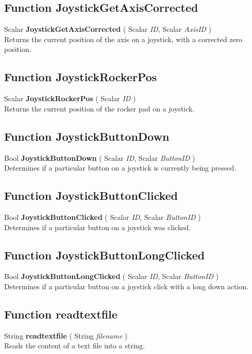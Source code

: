 \documentclass[10pt]{book}
\begin{document}
\subsection{Function JoystickGetAxisCorrected \label{F:JoystickGetAxisCorrected}}
Scalar \textbf{JoystickGetAxisCorrected} ( Scalar \textit{ID}, Scalar \textit{AxisID} ) \\
Returns the current position of the axis on a joystick, with a corrected zero position.

\subsection{Function JoystickRockerPos \label{F:JoystickRockerPos}}
Scalar \textbf{JoystickRockerPos} ( Scalar \textit{ID} ) \\
Returns the current position of the rocker pad on a joystick.

\subsection{Function JoystickButtonDown \label{F:JoystickButtonDown}}
Bool \textbf{JoystickButtonDown} ( Scalar \textit{ID}, Scalar \textit{ButtonID} ) \\
Determines if a particular button on a joystick is currently being pressed.

\subsection{Function JoystickButtonClicked \label{F:JoystickButtonClicked}}
Bool \textbf{JoystickButtonClicked} ( Scalar \textit{ID}, Scalar \textit{ButtonID} ) \\
Determines if a particular button on a joystick was clicked.

\subsection{Function JoystickButtonLongClicked \label{F:JoystickButtonLongClicked}}
Bool \textbf{JoystickButtonLongClicked} ( Scalar \textit{ID}, Scalar \textit{ButtonID} ) \\
Determines if a particular button on a joystick click with a long down action.

\subsection{Function readtextfile \label{F:readtextfile}}
String \textbf{readtextfile} ( String \textit{filename} ) \\
Reads the content of a text file into a string.
\end{document}
